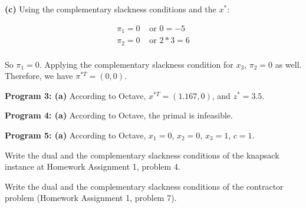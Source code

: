 \documentclass[fleqn]{homework}
\begin{document}
\begin{problem}{2}
    \textbf{(c)} Using the complementary slackness conditions and the $x^*$:

    \begin{align*}
      \pi_1 = 0 &\text{ or } 0 = -5 \\
      \pi_2 = 0 &\text{ or } 2*3 = 6 \\      
    \end{align*}

    So $\pi_1 = 0$.  Applying the complementary slackness condition for $x_3$,
    $\pi_2 = 0$ as well.  Therefore, we have $\pi^{*T} = (0, 0)$.

    \textbf{Program 3: (a)} According to Octave, $x^{*T} = (1.167, 0)$, and
    $z^* = 3.5$.

    \textbf{Program 4: (a)} According to Octave, the primal is infeasible.

    \textbf{Program 5: (a)} According to Octave, $x_1 = 0$, $x_2 = 0$,
    $x_3 = 1$, $c = 1$.

  \end{problem}

  \begin{problem}{3}
    \begin{question}
      Write the dual and the complementary slackness conditions of the knapsack
      instance at Homework Assignment 1, problem 4.
    \end{question}
  \end{problem}

  \begin{problem}{4}
    \begin{question}
      Write the dual and the complementary slackness conditions of the
      contractor problem (Homework Assignment 1, problem 7).
    \end{question}
  \end{problem}
\end{document}
